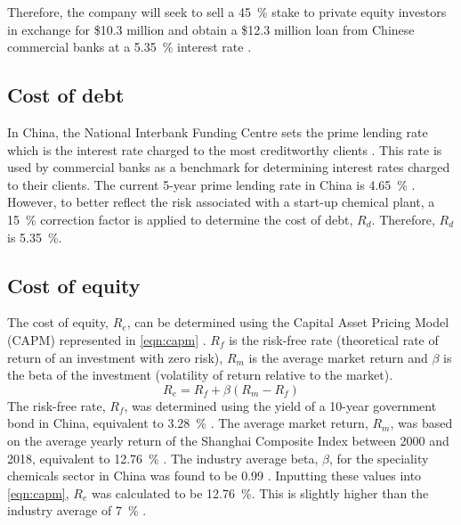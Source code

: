Therefore, the company will seek to sell a \SI{45}{\percent} stake to private equity investors in exchange for \$10.3 million and obtain a \$12.3 million loan from Chinese commercial banks at a \SI{5.35}{\percent} interest rate \cite{industrial_and_commercial_bank_of_china_rmb_2021}.

\subsection{Cost of debt}
\label{sec:debt}
In China, the National Interbank Funding Centre sets the prime lending rate which is the interest rate charged to the most creditworthy clients \cite{investingcom_peoples_2021}. This rate is used by commercial banks as a benchmark for determining interest rates charged to their clients. The current 5-year prime lending rate in China is \SI{4.65}{\percent} \cite{industrial_and_commercial_bank_of_china_rmb_2021}. However, to better reflect the risk associated with a start-up chemical plant, a \SI{15}{\percent} correction factor is applied to determine the cost of debt, $R_{d}$. Therefore, $R_{d}$ is \SI{5.35}{\percent}.

\subsection{Cost of equity}
\label{sec:equity}
The cost of equity, $R_{e}$, can be determined using the Capital Asset Pricing Model (CAPM) represented in \cref{eqn:capm} \cite{kenton_capital_2021}. $R_{f}$ is the risk-free rate (theoretical rate of return of an investment with zero risk), $R_{m}$ is the average market return and $\beta$ is the beta of the investment (volatility of return relative to the market).
\begin{equation}
\label{eqn:capm}
    R_{e}=R_{f}+\beta(R_{m}-R_{f})
\end{equation}
The risk-free rate, $R_{f}$, was determined using the yield of a 10-year government bond in China, equivalent to \SI{3.28}{\percent} \cite{tradingeconomics_china_2021}. The average market return, $R_{m}$, was based on the average yearly return of the Shanghai Composite Index between 2000 and 2018, equivalent to \SI{12.76}{\percent} \cite{macrotrends_china_2021}. The industry average beta, $\beta$, for the speciality chemicals sector in China was found to be 0.99 \cite{damodaran_useful_2019}. Inputting these values into \cref{eqn:capm}, $R_{e}$ was calculated to be \SI{12.76}{\percent}. This is slightly higher than the industry average of \SI{7}{\percent} \cite{damodaran_useful_2019}.

